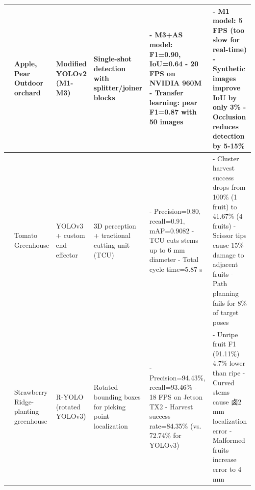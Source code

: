 \documentclass[a4paper,fleqn]{cas-dc}
\begin{document}
\begin{table}[htbp]
\begin{tabular}{@{}p{}p{}p{}p{}p{}p{}@{}}
	\cite{bresilla2019single} \newline 2019 & Apple, Pear \newline Outdoor orchard & Modified YOLOv2 (M1-M3) & Single-shot detection with splitter/joiner blocks & - M3+AS model: F1=0.90, IoU=0.64 \newline - 20 FPS on NVIDIA 960M \newline - Transfer learning: pear F1=0.87 with 50 images & - M1 model: 5 FPS (too slow for real-time) \newline - Synthetic images improve IoU by only 3\% \newline - Occlusion reduces detection by 5-15\% \\ \midrule
	\cite{jun2021towards} \newline 2021 & Tomato \newline Greenhouse & YOLOv3 + custom end-effector & 3D perception + tractional cutting unit (TCU) & - Precision=0.80, recall=0.91, mAP=0.9082 \newline - TCU cuts stems up to 6 mm diameter \newline - Total cycle time=5.87 s & - Cluster harvest success drops from 100\% (1 fruit) to 41.67\% (4 fruits) \newline - Scissor tips cause 15\% damage to adjacent fruits \newline - Path planning fails for 8\% of target poses \\ \midrule
	\cite{yu2020real} \newline 2020 & Strawberry \newline Ridge-planting greenhouse & R-YOLO (rotated YOLOv3) & Rotated bounding boxes for picking point localization & - Precision=94.43\%, recall=93.46\% \newline - 18 FPS on Jetson TX2 \newline - Harvest success rate=84.35\% (vs. 72.74\% for YOLOv3) & - Unripe fruit F1 (91.11\%) 4.7\% lower than ripe \newline - Curved stems cause 卤2 mm localization error \newline - Malformed fruits increase error to 4 mm \\ \midrule

	\end{tabular}
\end{table}
\end{document}

